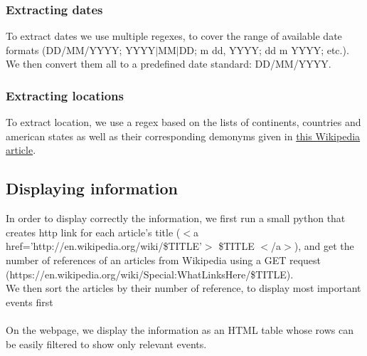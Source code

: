 \subsubsection{Extracting dates}
To extract dates we use multiple regexes, to cover the range of available date formats (DD/MM/YYYY; YYYY$|$MM$|$DD; m dd, YYYY; dd m YYYY; etc.). We then convert them all to a predefined date standard: DD/MM/YYYY. 
\subsubsection{Extracting locations}
To extract location, we use a regex based on the lists of continents, countries and american states as well as their corresponding demonyms given in \href{http://en.wikipedia.org/wiki/List_of_adjectival_forms_of_place_names}{this Wikipedia article}.
\subsection{Displaying information}
In order to display correctly the information, we first run a small python that creates http link for each article's title ($<$a href='http://en.wikipedia.org/wiki/\$TITLE'$>$ \$TITLE $<$/a$>$), and get the number of references of an articles from Wikipedia using a GET request (https://en.wikipedia.org/wiki/Special:WhatLinksHere/\$TITLE).\\
We then sort the articles by their number of reference, to display most important events first\\\\
On the webpage, we display the information as an HTML table whose rows can be easily filtered to show only relevant events.
%
